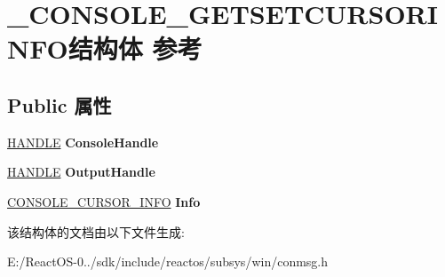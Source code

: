 \hypertarget{struct___c_o_n_s_o_l_e___g_e_t_s_e_t_c_u_r_s_o_r_i_n_f_o}{}\section{\+\_\+\+C\+O\+N\+S\+O\+L\+E\+\_\+\+G\+E\+T\+S\+E\+T\+C\+U\+R\+S\+O\+R\+I\+N\+F\+O结构体 参考}
\label{struct___c_o_n_s_o_l_e___g_e_t_s_e_t_c_u_r_s_o_r_i_n_f_o}
\subsection*{Public 属性}
\begin{DoxyCompactItemize}
\item 
\mbox{\label{struct___c_o_n_s_o_l_e___g_e_t_s_e_t_c_u_r_s_o_r_i_n_f_o_a03fc6109890d262bf475292e6232ddaa}} 
\hyperlink{interfacevoid}{H\+A\+N\+D\+LE} {\bfseries Console\+Handle}
\item 
\mbox{\label{struct___c_o_n_s_o_l_e___g_e_t_s_e_t_c_u_r_s_o_r_i_n_f_o_ae38113f3ada33c5ec808b5cdfe120e30}} 
\hyperlink{interfacevoid}{H\+A\+N\+D\+LE} {\bfseries Output\+Handle}
\item 
\mbox{\label{struct___c_o_n_s_o_l_e___g_e_t_s_e_t_c_u_r_s_o_r_i_n_f_o_a4fa564850a3b886122f168d0d0f93e49}} 
\hyperlink{structtag_c_o_n_s_o_l_e___c_u_r_s_o_r___i_n_f_o}{C\+O\+N\+S\+O\+L\+E\+\_\+\+C\+U\+R\+S\+O\+R\+\_\+\+I\+N\+FO} {\bfseries Info}
\end{DoxyCompactItemize}


该结构体的文档由以下文件生成\+:\begin{DoxyCompactItemize}
\item 
E\+:/\+React\+O\+S-\/0../sdk/include/reactos/subsys/win/conmsg.\+h\end{DoxyCompactItemize}
